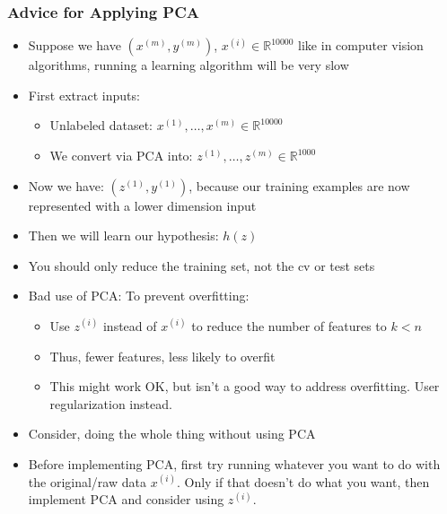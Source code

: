 \subsubsection{Advice for Applying PCA}
\begin{itemize}[--]
	\item Suppose we have $(x^{(m)}, y^{(m)})$, $x^{(i)}\in\mathbb{R}^{10000}$ like in computer vision algorithms, running a learning algorithm will be very slow
	\item First extract inputs:
	\begin{itemize}[--]
		\item Unlabeled dataset: $x^{(1)},\ldots, x^{(m)}\in\mathbb{R}^{10000}$
		\item We convert via PCA into: $z^{(1)},\ldots, z^{(m)}\in\mathbb{R}^{1000}$
	\end{itemize}
	\item Now we have: $(z^{(1)}, y^{(1)})$, because our training examples are now represented with a lower dimension input
	\item Then we will learn our hypothesis: $h(z)$
	\item You should only reduce the training set, not the cv or test sets
	\item Bad use of PCA: To prevent overfitting:
	\begin{itemize}[--]
		\item Use $z^{(i)}$ instead of $x^{(i)}$ to reduce the number of features to $k < n$
		\item Thus, fewer features, less likely to overfit
		\item This might work OK, but isn't a good way to address overfitting. User regularization instead.
	\end{itemize}

	\item Consider, doing the whole thing without using PCA
	\item Before implementing PCA, first try running whatever you want to do with the original/raw data $x^{(i)}$. Only if that doesn't do what you want, then implement PCA and consider using $z^{(i)}$.

\end{itemize}
